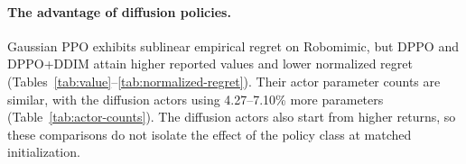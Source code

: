 








\paragraph{The advantage of diffusion policies.} Gaussian PPO exhibits sublinear empirical regret on Robomimic, but DPPO and DPPO+DDIM attain higher reported values and lower normalized regret (Tables~\ref{tab:value}--\ref{tab:normalized-regret}). Their actor parameter counts are similar, with the diffusion actors using 4.27--7.10\% more parameters (Table~\ref{tab:actor-counts}). The diffusion actors also start from higher returns, so these comparisons do not isolate the effect of the policy class at matched initialization.



